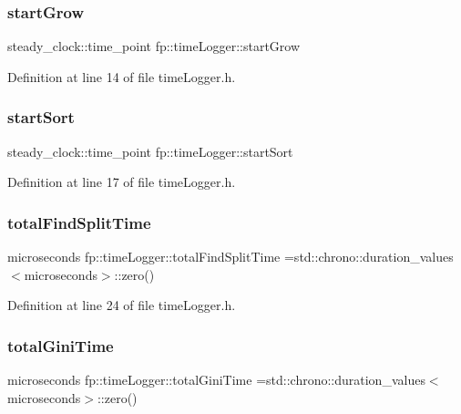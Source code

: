 \subsubsection{\texorpdfstring{start\+Grow}{startGrow}}
{\footnotesize\ttfamily steady\+\_\+clock\+::time\+\_\+point fp\+::time\+Logger\+::start\+Grow}



Definition at line 14 of file time\+Logger.\+h.

\mbox{\label{classfp_1_1timeLogger_afed53c702d6f414558eb7ca49f37ff22}} 
\subsubsection{\texorpdfstring{start\+Sort}{startSort}}
{\footnotesize\ttfamily steady\+\_\+clock\+::time\+\_\+point fp\+::time\+Logger\+::start\+Sort}



Definition at line 17 of file time\+Logger.\+h.

\mbox{\label{classfp_1_1timeLogger_a11998b4bff9e1f548f4468e25f79a6f2}} 
\subsubsection{\texorpdfstring{total\+Find\+Split\+Time}{totalFindSplitTime}}
{\footnotesize\ttfamily microseconds fp\+::time\+Logger\+::total\+Find\+Split\+Time =std\+::chrono\+::duration\+\_\+values$<$microseconds$>$\+::zero()\hspace{0.3cm}{\ttfamily [static]}}



Definition at line 24 of file time\+Logger.\+h.

\mbox{\label{classfp_1_1timeLogger_a1f1c446894052c4df2100b501069a927}} 
\subsubsection{\texorpdfstring{total\+Gini\+Time}{totalGiniTime}}
{\footnotesize\ttfamily microseconds fp\+::time\+Logger\+::total\+Gini\+Time =std\+::chrono\+::duration\+\_\+values$<$microseconds$>$\+::zero()\hspace{0.3cm}{\ttfamily [static]}}



